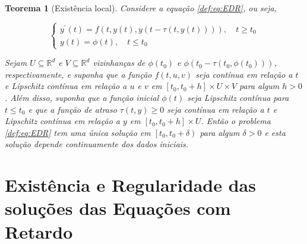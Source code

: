 \documentclass{beamer}
\theoremstyle{plain}
\newtheorem{teo}{Teorema}
\theoremstyle{definition}
\begin{document}

\begin{frame}
     
\begin{teo}[Existência local]
  \label{teo:local_existence:EDR}
  \small
  Considere a equação \eqref{def:eq:EDR}, ou seja,

  \[
    \left\{\begin{array}{l}
        y^{\prime}(t)=f(t, y(t), y(t-\tau(t, y(t)))), \quad t \geq t_{0}  \\
        y(t)=\phi(t), \quad t \leq t_{0}
    \end{array}\right.
  \]

  Sejam \(U \subseteq \mathbb{R}^{d}\) e \(V \subseteq \mathbb{R}^{d}\) vizinhanças de \(\phi\left(t_{0}\right)\) e \(\phi\left(t_{0}-\tau\left(t_{0}, \phi\left(t_{0}\right)\right)\right)\), respectivamente, e suponha que a função \(f(t, u, v)\) seja contínua em relação a \(t\) e Lipschitz contínua em relação a \(u\) e \(v\) em \(\left[t_{0}, t_{0}+h\right] \times U \times V\) para algum \(h>0\). Além disso, suponha que a função inicial \(\phi(t)\) seja Lipschitz contínua para \(t \leq t_{0}\) e que a função de atraso \(\tau(t, y) \geq 0\) seja contínua em relação a \(t\) e Lipschitz contínua em relação a \(y\) em \(\left[t_{0}, t_{0}+h\right] \times U\). Então o problema \ref{def:eq:EDR} tem uma única solução em \(\left[t_{0}, t_{0}+\delta\right)\) para algum \(\delta>0\) e esta solução depende continuamente dos dados iniciais.

\end{teo}
\end{frame}


\section{Existência e Regularidade das soluções das Equações com Retardo}
\end{document}
